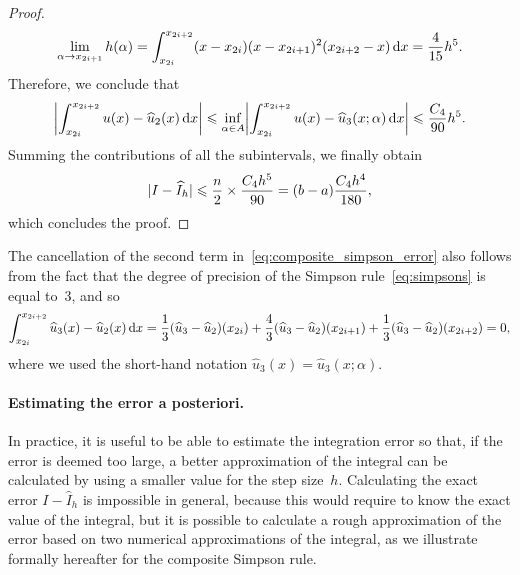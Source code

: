 \begin{proof}
\[
    \lim_{\alpha \to x_{2i+1}} h(\alpha) =
    \int_{x_{2i}}^{x_{2i+2}} (x-x_{2i})(x- x_{2i+1})^2 (x_{2i+2} - x) \, \mathrm d x = \frac{4}{15} h^5.
\]
Therefore, we conclude that
\[
    \abs*{\int_{x_{2i}}^{x_{2i+2}} u(x) - \widehat u_2(x)  \, \d x}
    \leq \inf_{\alpha \in A} \abs*{\int_{x_{2i}}^{x_{2i+2}} u(x) - \widehat u_3(x; \alpha)  \, \d x} \leq \frac{C_4}{90} h^5.
\]
Summing the contributions of all the subintervals,
we finally obtain
\begin{equation}
    \label{eq:scaling_error}
    \lvert I - \widehat I_h\rvert \leqslant  \frac{n}{2} \times \frac{C_4 h^5}{90} = (b-a)\frac{C_4 h^4}{180},
\end{equation}
which concludes the proof.
\end{proof}

\begin{remark}
The cancellation of the second term in~\eqref{eq:composite_simpson_error} also follows from the fact that
the degree of precision of the Simpson rule~\eqref{eq:simpsons} is equal to~3,
and so
\[
    \int_{x_{2i}}^{x_{2i+2}} \widehat u_3(x) - \widehat u_2(x)  \, \mathrm d x = \frac{1}{3} (\widehat u_3 - \widehat u_2)(x_{2i}) + \frac{4}{3} (\widehat u_3 - \widehat u_2)(x_{2i+1}) + \frac{1}{3} (\widehat u_3 - \widehat u_2)(x_{2i+2}) = 0,
\]
where we used the short-hand notation $\widehat u_3(x) = \widehat u_3(x; \alpha)$.
\end{remark}

\paragraph{Estimating the error a posteriori.}
In practice,
it is useful to be able to estimate the integration error so that,
if the error is deemed too large,
a better approximation of the integral can be calculated by using a smaller value for the step size~$h$.
Calculating the exact error $I - \widehat I_h$ is impossible in general,
because this would require to know the exact value of the integral,
but it is possible to calculate a rough approximation of the error based on two numerical approximations of the integral,
as we illustrate formally hereafter for the composite Simpson rule.

